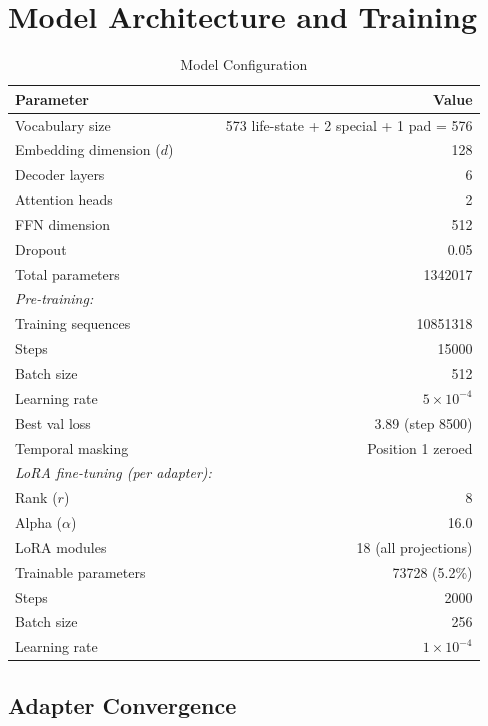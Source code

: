 \documentclass[12pt]{article}
\begin{document}
\section{Model Architecture and Training}
\label{app:model}

\begin{table}[H]
\centering
\caption{Model Configuration}
\label{tab:config}
\begin{tabular}{lr}
\toprule
Parameter & Value \\
\midrule
Vocabulary size & 573 life-state + 2 special + 1 pad = 576 \\
Embedding dimension ($d$) & 128 \\
Decoder layers & 6 \\
Attention heads & 2 \\
FFN dimension & 512 \\
Dropout & 0.05 \\
Total parameters & \num{1342017} \\
\addlinespace
\textit{Pre-training:} & \\
\quad Training sequences & \num{10851318} \\
\quad Steps & \num{15000} \\
\quad Batch size & 512 \\
\quad Learning rate & $5 \times 10^{-4}$ \\
\quad Best val loss & 3.89 (step \num{8500}) \\
\quad Temporal masking & Position 1 zeroed \\
\addlinespace
\textit{LoRA fine-tuning (per adapter):} & \\
\quad Rank ($r$) & 8 \\
\quad Alpha ($\alpha$) & 16.0 \\
\quad LoRA modules & 18 (all projections) \\
\quad Trainable parameters & \num{73728} (5.2\%) \\
\quad Steps & \num{2000} \\
\quad Batch size & 256 \\
\quad Learning rate & $1 \times 10^{-4}$ \\
\bottomrule
\end{tabular}
\end{table}

\subsection{Adapter Convergence}
\end{document}
